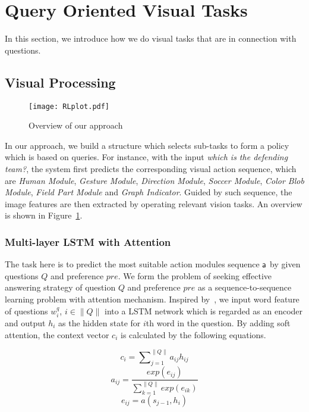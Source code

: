 \section{Query Oriented Visual Tasks}
\label{sec-reinforcement-learning}
In this section, we introduce how we do visual tasks that are in connection with questions. 


\subsection{Visual Processing}
\label{sec-visual-processing}
\begin{figure}[h]
\begin{center}
\texttt{[image: RLplot.pdf]}
\end{center}
\caption{Overview of our approach}
\label{fig:RLplot}
\end{figure}

In our approach, we build a structure which selects sub-tasks to form a policy which is based on queries. For instance, with the input \textit{which is the defending team?}, the system first predicts the corresponding visual action sequence, which are \textit{Human Module}, \textit{Gesture Module}, \textit{Direction Module}, \textit{Soccer Module}, \textit{Color Blob Module}, \textit{Field Part Module} and \textit{Graph Indicator}. Guided by such sequence, the image features are then extracted by operating relevant vision tasks. An overview is shown in Figure~\ref{fig:RLplot}.


\subsubsection{Multi-layer LSTM with Attention}
\label{sec-LSTM}
\hspace{\parindent}The task here is to predict the most suitable action modules sequence ${\mathsf{a}}$ by given questions $Q$ and preference $pre$. We form the problem of seeking effective answering strategy of question $Q$ and preference $pre$ as a sequence-to-sequence learning problem with attention mechanism. Inspired by~\cite{Bahdanau2016}, we input word feature of questions $w_i^q$, $i\in\|Q\|$ into a LSTM network which is regarded as an encoder and output $h_i$ as the hidden state for $i$th word in the question. By adding soft attention, the context vector $c_i$ is calculated by the following equations.


\begin{small}
\begin{equation} 
    c_i= \sum\nolimits_{j=1}^{\|Q\|} a_{ij}h_{ij}
\end{equation}
\begin{equation} 
    a_{ij}= \frac{exp(e_{ij})}{\sum\nolimits_{k=1}^{\|Q\|} exp(e_{ik})}
\end{equation}
\begin{equation} 
    e_{ij}= a(s_{j-1},h_i)
\end{equation}
\end{small}

